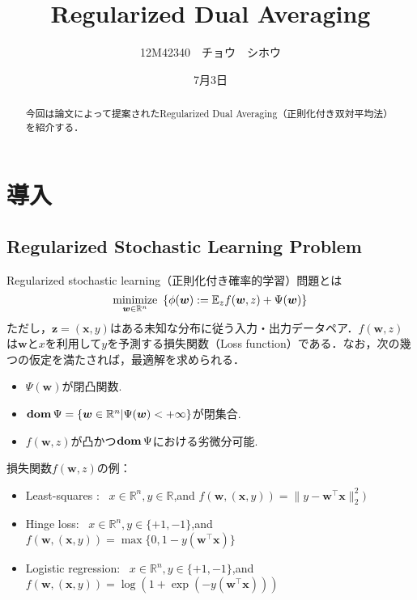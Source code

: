 \documentclass[a4paper,11pt]{jsarticle}
\title{Regularized Dual Averaging}
\author{12M42340　チョウ　シホウ}
\date{7月3日}
\numberwithin{theorem}{section}  %
\numberwithin{equation}{section} %
\newcommand{\dom}{\mathop{\mathrm{\bf dom}}\nolimits}
\newcommand{\minimize}{\mathop{\mathrm{\rm minimize}}\limits}
\begin{document}
{}
\renewcommand{\thepart}{\arabic{part}}

\thispagestyle{empty}
\maketitle

\begin{abstract}
今回は論文\cite{RDA}によって提案されたRegularized Dual Averaging（正則化付き双対平均法）を紹介する．
\end{abstract}

\section{導入}
\subsection{Regularized Stochastic Learning Problem}
Regularized stochastic learning（正則化付き確率的学習）問題とは
\begin{equation}
\minimize_{\bm{w} \in \mathbb{R}^n} \,\,\, \{ \phi(\bm{w}):= \mathbb{E}_{z}f(\bm{w},z) + \Psi(\bm{w})\}
\label{BASEPROB}
\end{equation}
ただし，$\bm{z}=(\bm{x},y)$はある未知な分布に従う入力・出力データペア．$f(\bm{w},z)$は$\bm{w}$と$x$を利用して$y$を予測する損失関数（Loss function）である．なお，次の幾つの仮定を満たされば，最適解を求められる．
\begin{itemize}
\item $\Psi(\bm{w})$が閉凸関数.
\item $\dom \Psi = \{\bm{w} \in \mathbb{R}^n | \Psi(\bm{w}) < +\infty \}$が閉集合.
\item $f(\bm{w},z)$が凸かつ$\dom \Psi$における劣微分可能.
\end{itemize}

損失関数$f(\bm{w}, z)$の例：
\begin{itemize}
\item Least-squares :\,\,\, $x \in \mathbb{R}^n, y\in \mathbb{R}$,and $f(\bm{w},(\bm{x},y)) = \| y - \bm{w}^\intercal \bm{x} \|_2^2 )$
\item Hinge loss:\,\,\, $x \in \mathbb{R}^n,y \in \{+1, -1 \}$,and $f(\bm{w},(\bm{x},y)) = \max\{0, 1-y(\bm{w}^\intercal \bm{x}) \}$
\item Logistic regression:\,\,\, $x \in \mathbb{R}^n, y \in \{+1, -1 \}$,and $f(\bm{w},(\bm{x},y)) = \log (1+\exp(-y(\bm{w}^\intercal \bm{x})))$
\end{itemize}
\end{document}
